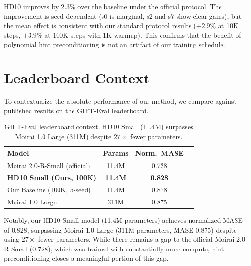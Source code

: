 \documentclass{article}
\begin{document}
HD10 improves by 2.3\% over the baseline under the official protocol. The improvement is seed-dependent (s0 is marginal, s2 and s7 show clear gains), but the mean effect is consistent with our standard protocol results ($+2.9\%$ at 10K steps, $+3.9\%$ at 100K steps with 1K warmup). This confirms that the benefit of polynomial hint preconditioning is not an artifact of our training schedule.

\section{Leaderboard Context}
\label{app:leaderboard}

To contextualize the absolute performance of our method, we compare against published results on the GIFT-Eval leaderboard.

\begin{table}[h]
\centering
\caption{GIFT-Eval leaderboard context. HD10 Small (11.4M) surpasses Moirai 1.0 Large (311M) despite $27\times$ fewer parameters.}
\small
\begin{tabular}{lccc}
\toprule
\textbf{Model} & \textbf{Params} & \textbf{Norm.\ MASE} \\
\midrule
Moirai 2.0-R-Small (official) & 11.4M & 0.728 \\
\textbf{HD10 Small (Ours, 100K)} & \textbf{11.4M} & \textbf{0.828} \\
Our Baseline (100K, 5-seed) & 11.4M & 0.878 \\
Moirai 1.0 Large & 311M & 0.875 \\
\bottomrule
\end{tabular}
\end{table}

Notably, our HD10 Small model (11.4M parameters) achieves normalized MASE of 0.828, surpassing Moirai 1.0 Large (311M parameters, MASE 0.875) despite using $27\times$ fewer parameters. While there remains a gap to the official Moirai 2.0-R-Small (0.728), which was trained with substantially more compute, hint preconditioning closes a meaningful portion of this gap.
\end{document}
